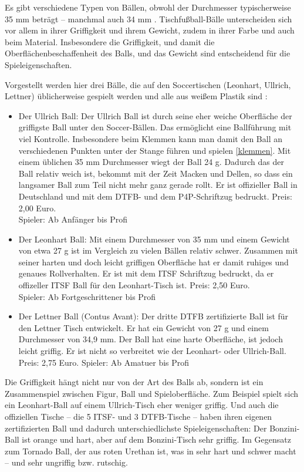 Es gibt verschiedene Typen von Bällen, obwohl der Durchmesser typischerweise 35 mm beträgt -- manchmal auch 34 mm \citep{www:kickerbau:baelle}.
Tischfußball-Bälle unterscheiden sich vor allem in ihrer Griffigkeit und ihrem Gewicht, zudem in ihrer Farbe und auch beim Material.
Insbesondere die Griffigkeit, und damit die Oberflächenbeschaffenheit des Balls, und das Gewicht sind entscheidend für die Spieleigenschaften.  

Vorgestellt werden hier drei Bälle, die auf den Soccertischen (Leonhart, Ullrich, Lettner) üblicherweise gespielt werden und alle aus weißem Plastik sind \citep{www:tfc-reutlingen}:
\begin{itemize}
\item Der Ullrich Ball:
Der Ullrich Ball ist durch seine eher weiche Oberfläche der griffigste Ball unter den Soccer-Bällen. 
Das ermöglicht eine Ballführung mit viel Kontrolle. Insbesondere beim Klemmen kann man damit den Ball an verschiedenen Punkten unter der Stange führen und spielen \ref{klemmen}.
Mit einem üblichen 35 mm Durchmesser wiegt der Ball 24 g.
Dadurch das der Ball relativ weich ist, bekommt mit der Zeit Macken und Dellen, so dass ein langsamer Ball zum Teil nicht mehr ganz gerade rollt.
Er ist offizieller Ball in Deutschland und mit dem DTFB- und dem P4P-Schriftzug bedruckt.
Preis: 2,00 Euro. \\
Spieler: Ab Anfänger bis Profi
\item Der Leonhart Ball: 
Mit einem Durchmesser von 35 mm und einem Gewicht von etwa 27 g ist im Vergleich zu vielen Bällen relativ schwer. 
Zusammen mit seiner harten und doch leicht griffigen Oberfläche hat er damit ruhiges und genaues Rollverhalten.
Er ist mit dem ITSF Schriftzug bedruckt, da er offizeller ITSF Ball für den Leonhart-Tisch ist.
Preis: 2,50 Euro. \\
Spieler: Ab Fortgeschrittener bis Profi
\item Der Lettner Ball (Contus Avant):
Der dritte DTFB zertifizierte Ball ist für den Lettner Tisch entwickelt.
Er hat ein Gewicht von 27 g und einem Durchmesser von 34,9 mm.
Der Ball hat eine harte Oberfläche, ist jedoch leicht griffig. 
Er ist nicht so verbreitet wie der Leonhart- oder Ullrich-Ball. \\
Preis: 2,75 Euro.
Spieler: Ab Amatuer bis Profi
\end{itemize}

Die Griffigkeit hängt nicht nur von der Art des Balls ab, sondern ist ein Zusammenspiel zwischen Figur, Ball und Spieloberfläche. 
Zum Beispiel spielt sich ein Leonhart-Ball auf einem Ullrich-Tisch eher weniger griffig.  
Und auch die offiziellen Tische -- die 5 ITSF- und 3 DTFB-Tische -- haben ihren eigenen zertifizierten Ball und dadurch unterschiedlichste Spieleigenschaften:
Der Bonzini-Ball ist orange und hart, aber auf dem Bonzini-Tisch sehr griffig. 
Im Gegensatz zum Tornado Ball, der aus roten Urethan ist, was in sehr hart und schwer macht -- und sehr ungriffig bzw. rutschig. 



